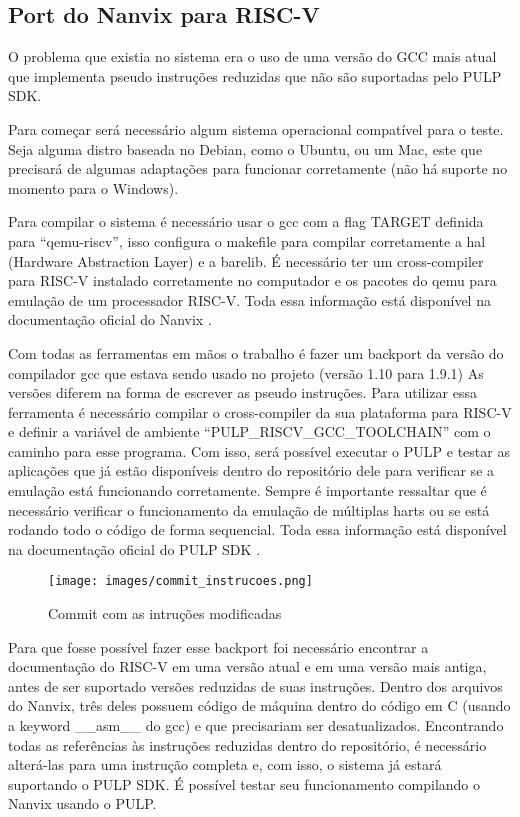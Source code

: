\subsection{Port do Nanvix para RISC-V}

O problema que existia no sistema era o uso de uma versão do GCC mais atual que implementa pseudo instruções reduzidas que não são suportadas pelo PULP SDK. 

Para começar será necessário algum sistema operacional compatível para o teste. Seja alguma distro baseada no Debian, como o Ubuntu, ou um Mac, este que 
precisará de algumas adaptações para funcionar corretamente (não há suporte no momento para o Windows). 

Para compilar o sistema é necessário usar o gcc com a flag TARGET definida para “qemu-riscv”, isso configura o makefile para compilar corretamente a 
hal (Hardware Abstraction Layer) e a barelib. É necessário ter um cross-compiler para RISC-V instalado corretamente no computador e os pacotes do qemu 
para emulação de um processador RISC-V. Toda essa informação está disponível na documentação oficial do Nanvix \cite{NanvixOS}. 

Com todas as ferramentas em mãos o trabalho é fazer um backport da versão do compilador gcc que estava sendo usado no projeto (versão 1.10 para 1.9.1) As versões 
diferem na forma de escrever as pseudo instruções. Para utilizar essa ferramenta é necessário compilar o cross-compiler da sua plataforma para RISC-V e definir a 
variável de ambiente “PULP\_RISCV\_GCC\_TOOLCHAIN” com o caminho para esse programa. Com isso, será possível executar o PULP e testar as aplicações que já estão 
disponíveis dentro do repositório dele para verificar se a emulação está funcionando corretamente. Sempre é importante ressaltar que é necessário verificar o 
funcionamento da emulação de múltiplas harts ou se está rodando todo o código de forma sequencial. Toda essa informação está disponível na documentação oficial 
do PULP SDK \cite{PulpSDKRepositorio}.

\begin{figure}[h!]
    \centering
    \texttt{[image: images/commit\_instrucoes.png]}
    \caption{Commit com as intruções modificadas \\ \cite{SolucaoInstrucoesDOWNGrade}} %
\end{figure}

Para que fosse possível fazer esse backport foi necessário encontrar a documentação do RISC-V em uma versão atual e em uma versão mais antiga, antes de ser suportado 
versões reduzidas de suas instruções. Dentro dos arquivos do Nanvix, três deles  possuem código de máquina dentro do código em C (usando a keyword \_\_asm\_\_ do gcc) 
e que precisariam ser desatualizados. Encontrando todas as referências às instruções reduzidas dentro do repositório, é necessário alterá-las para uma instrução completa
e, com isso, o sistema já estará suportando o PULP SDK. É possível testar seu funcionamento compilando o Nanvix usando o PULP.

